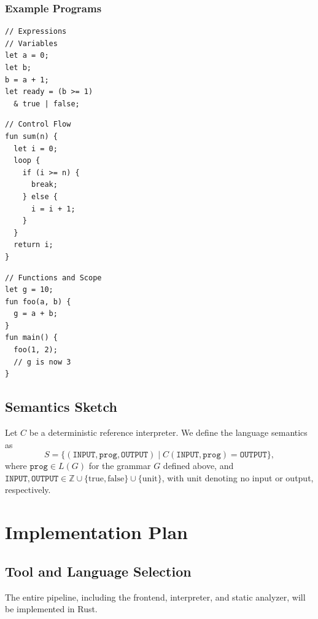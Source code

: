 \documentclass{article}
\begin{document}
\subsubsection{Example Programs}
\noindent\begin{minipage}[t]{0.32\linewidth}
\begin{Verbatim}[fontsize=\small]
// Expressions
// Variables
let a = 0;
let b;
b = a + 1;
let ready = (b >= 1)
  & true | false;
\end{Verbatim}
\end{minipage}\hfill
\begin{minipage}[t]{0.32\linewidth}
\begin{Verbatim}[fontsize=\small]
// Control Flow
fun sum(n) {
  let i = 0;
  loop {
    if (i >= n) {
      break;
    } else {
      i = i + 1;
    }
  }
  return i;
}
\end{Verbatim}
\end{minipage}\hfill
\begin{minipage}[t]{0.32\linewidth}
\begin{Verbatim}[fontsize=\small]
// Functions and Scope
let g = 10;
fun foo(a, b) {
  g = a + b;
}
fun main() {
  foo(1, 2);
  // g is now 3
}
\end{Verbatim}
\end{minipage}

\subsection{Semantics Sketch}
Let $C$ be a deterministic reference interpreter. We define the language
semantics as
\[
S = \{(\texttt{INPUT}, \texttt{prog}, \texttt{OUTPUT})
      \mid C(\texttt{INPUT}, \texttt{prog}) = \texttt{OUTPUT}\},
\]
where $\texttt{prog} \in L(G)$ for the grammar $G$ defined above, and
$\texttt{INPUT}, \texttt{OUTPUT} \in \mathbb{Z}
\cup \{\mathrm{true}, \mathrm{false}\} \cup \{\mathrm{unit}\}$,
with $\mathrm{unit}$ denoting no input or output, respectively.

\section{Implementation Plan}

\subsection{Tool and Language Selection}
The entire pipeline, including the frontend, interpreter, and static analyzer,
will be implemented in Rust.
\end{document}
